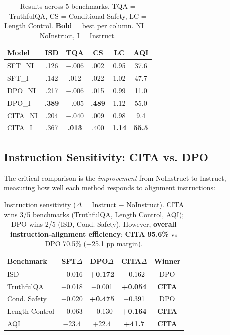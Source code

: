 \begin{table}[H]
\centering
\footnotesize
\begin{tabular}{@{}lccccc@{}}
\toprule
\textbf{Model} & \textbf{ISD} & \textbf{TQA} & \textbf{CS} & \textbf{LC} & \textbf{AQI} \\
\midrule
SFT\_NI & .126 & $-$.006 & .002 & 0.95 & 37.6 \\
\hline
SFT\_I & .142 & .012 & .022 & 1.02 & 47.7 \\
\hline
DPO\_NI & .217 & $-$.006 & .015 & 0.99 & 11.0 \\
\hline
DPO\_I & \textbf{.389} & $-$.005 & \textbf{.489} & 1.12 & 55.0 \\
\hline
CITA\_NI & .204 & $-$.040 & .009 & 0.98 & 9.4 \\
\hline
CITA\_I & .367 & \textbf{.013} & .400 & \textbf{1.14} & \textbf{55.5} \\
\bottomrule
\end{tabular}
\caption{Results across 5 benchmarks. TQA = TruthfulQA, CS = Conditional Safety, LC = Length Control. \textbf{Bold} = best per column. NI = NoInstruct, I = Instruct.}
\label{tab:overall_results}
\vspace{-4mm}
\end{table}

\vspace{-2mm}
\subsection{Instruction Sensitivity: CITA vs. DPO}
\label{sec:improvement_comparison}

The critical comparison is the \textit{improvement} from NoInstruct to Instruct, measuring how well each method responds to alignment instructions:

\begin{table}[H]
\centering
\footnotesize
\begin{tabular}{@{}lcccc@{}}
\toprule
\textbf{Benchmark} & \textbf{SFT$\Delta$} & \textbf{DPO$\Delta$} & \textbf{CITA$\Delta$} & \textbf{Winner} \\
\midrule
ISD & +0.016 & \textbf{+0.172} & +0.162 & DPO \\
\hline
TruthfulQA & +0.018 & +0.001 & \textbf{+0.054} & \textbf{CITA} \\
\hline
Cond. Safety & +0.020 & \textbf{+0.475} & +0.391 & DPO \\
\hline
Length Control & +0.063 & +0.130 & \textbf{+0.164} & \textbf{CITA} \\
\hline
AQI & $-$23.4 & +22.4 & \textbf{+41.7} & \textbf{CITA} \\
\bottomrule
\end{tabular}
\caption{Instruction sensitivity ($\Delta$ = Instruct $-$ NoInstruct). CITA wins 3/5 benchmarks (TruthfulQA, Length Control, AQI); DPO wins 2/5 (ISD, Cond. Safety). However, \textbf{overall instruction-alignment efficiency}: \colorbox{bg-green}{\textbf{CITA 95.6\%}} vs DPO 70.5\% (+25.1 pp margin).}
\label{tab:improvement_comparison}
\vspace{-4mm}
\end{table}

